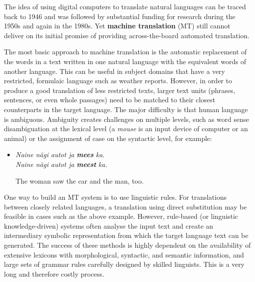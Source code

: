 \begin{multicols}{2}
The idea of using digital computers to translate natural languages can be traced back to 1946 and was followed by substantial funding for research during the 1950s and again in the 1980s.  Yet \textbf{machine translation} (MT) still cannot deliver on its initial promise of providing across-the-board automated translation.


The most basic approach to machine translation is the automatic replacement of the words in a text written in one natural language with the equivalent words of another language. This can be useful in subject domains that have a very restricted, formulaic language such as weather reports.
However, in order to produce a good translation of less restricted texts, larger text units (phrases, sentences, or even whole passages) need to be matched to their closest counterparts in the target language. The major difficulty is that human language is ambiguous. Ambiguity creates challenges on multiple levels, such as word sense disambiguation at the lexical level (a \textit{mouse} is an input device of computer or an animal) or the assignment of case on the syntactic level, for example:

\begin{itemize}
\item[] \textit{Naine nägi autot ja \textbf{mees} ka.}\\
\textit{Naine nägi autot ja \textbf{meest} ka.}

\smallskip
The woman saw the car and the man, too.
\end{itemize}

One way to build an MT system is to use linguistic rules. For translations between closely related languages, a translation using direct substitution may be feasible in cases such as the above example. However, rule-based (or linguistic knowledge-driven) systems often analyse the input text and create an intermediary symbolic representation from which the target language text can be generated. The success of these methods is highly dependent on the availability of extensive lexicons with morphological, syntactic, and semantic information, and large sets of grammar rules carefully designed by skilled linguists. This is a very long and therefore costly process.


\end{multicols}
